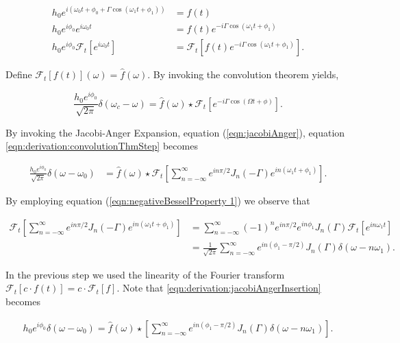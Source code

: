 \documentclass[onecolumn, groupedaddress, 10pt]{revtex4-1}
\begin{document}
\begin{align}
h_0 e^{i\left( \omega_0 t + \phi_0 + \Gamma \cos (\omega_1 t + \phi_1 ) \right)} &= f(t) 												\\
h_0 e^{i\phi_0} e^{i\omega_0 t} &= f(t) e^{-i\Gamma \cos (\omega_1 t + \phi_1)}															\\
h_0 e^{i\phi_0} \mathcal{F}_t \left[ e^{i\omega_0 t} \right] &= \mathcal{F}_t \left[ f(t) e^{-i\Gamma \cos (\omega_1 t + \phi_1)} \right].
\end{align}

Define $\mathcal{F}_t[f(t)](\omega) = \hat{f}(\omega)$. By invoking the convolution theorem yields,

\begin{equation}
\label{eqn:derivation:convolutionThmStep}
\frac{h_0 e^{i\phi_0}}{\sqrt{2\pi}} \delta (\omega_c - \omega) = \hat{f}(\omega) \star \mathcal{F}_t \left[ e^{-i\Gamma \cos (\Omega t + \phi)} \right].
\end{equation}

By invoking the Jacobi-Anger Expansion, equation (\ref{eqn:jacobiAnger}), equation \ref{eqn:derivation:convolutionThmStep} becomes

\begin{align}
\label{eqn:derivation:jacobiAngerInsertion}
\frac{h_0 e^{i\phi_0}}{\sqrt{2\pi}} \delta (\omega - \omega_0)
&=
\hat{f}(\omega)
\star \mathcal{F}_t \left[ \sum_{n=-\infty}^{\infty} e^{in\pi/2} J_n(-\Gamma) e^{in(\omega_1 t + \phi_1)} \right].
\end{align}

By employing equation (\ref{eqn:negativeBesselProperty 1}) we observe that

\begin{align}
\mathcal{F}_t \left[ \sum_{n=-\infty}^{\infty} e^{in\pi/2} J_n(-\Gamma) e^{in(\omega_1 t + \phi_1)} \right]
&= \sum_{n=-\infty}^{\infty} (-1)^n e^{in\pi/2} e^{in\phi_1} J_n(\Gamma) \mathcal{F}_t \left[e^{in\omega_1 t} \right]	 \\
&= \frac{1}{\sqrt{2\pi}}\sum_{n=-\infty}^{\infty} e^{in(\phi_1 - \pi/2)} J_n(\Gamma) \delta (\omega - n\omega_1).
\end{align}

In the previous step we used the linearity of the Fourier transform $\mathcal{F}_t[c \cdot f(t)] = c \cdot \mathcal{F}_t[f]$.  Note that \ref{eqn:derivation:jacobiAngerInsertion} becomes

\begin{align}
h_0 e^{i\phi_0} \delta (\omega - \omega_0) = \hat{f}(\omega)
\star
\left[ \sum_{n=-\infty}^{\infty} e^{in(\phi_1 - \pi/2)} J_n(\Gamma) \delta (\omega - n\omega_1) \right].
\end{align}
\end{document}
